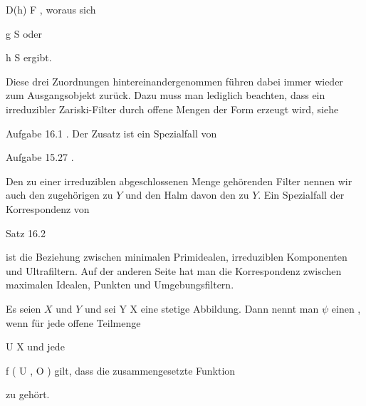 {\mavergleichskette
{\vergleichskette
{ D(h)
}
{ \in }{ F
}
{  }{
}
{    }{
}
{   }{
}
}
{}{}{,}
woraus sich

\mavergleichskette
{\vergleichskette
{ g
}
{ \in }{ S
}
{  }{
}
{    }{
}
{   }{
}
}
{}{}{}
oder

\mavergleichskette
{\vergleichskette
{ h
}
{ \in }{ S
}
{  }{
}
{    }{
}
{   }{
}
}
{}{}{}
ergibt.

Diese drei Zuordnungen hintereinandergenommen führen dabei immer wieder zum Ausgangsobjekt zurück. Dazu muss man lediglich beachten, dass ein irreduzibler Zariski-Filter durch offene Mengen der Form
 erzeugt wird, siehe

Aufgabe 16.1
.
Der Zusatz ist ein Spezialfall von

Aufgabe 15.27
.




}



Den zu einer irreduziblen abgeschlossenen Menge gehörenden Filter nennen wir auch den zugehörigen  {} zu $Y$ und den Halm davon den  {} zu $Y$. Ein Spezialfall der Korrespondenz von

Satz 16.2

ist die Beziehung zwischen minimalen Primidealen, irreduziblen Komponenten und Ultrafiltern. Auf der anderen Seite hat man die Korrespondenz zwischen maximalen Idealen, Punkten und Umgebungsfiltern.







{}
{





Es seien $X$ und $Y$
und sei
\maabbdisp {{\psi}} { Y } { X
} {}
eine stetige Abbildung. Dann nennt man ${\psi}$ einen 
 {} {,}
wenn für jede offene Teilmenge

\mavergleichskette
{\vergleichskette
{ U
}
{ \subseteq }{ X
}
{  }{
}
{    }{
}
{   }{
}
}
{}{}{}
und jede

\mavergleichskette
{\vergleichskette
{ f
}
{ \in }{ \Gamma ( U , {\mathcal O} )
}
{  }{
}
{    }{
}
{   }{
}
}
{}{}{}
gilt, dass die zusammengesetzte Funktion

 {  }

zu
 gehört.





}

